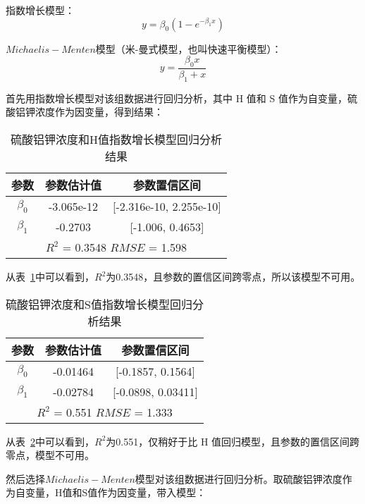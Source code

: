     指数增长模型：$$y=\beta_0(1-e^{-\beta_1x})$$

    $Michaelis-Menten$模型（米-曼式模型，也叫快速平衡模型）：
    $$y=\frac{\beta_0x}{\beta_1+x}$$
    
    首先用指数增长模型对该组数据进行回归分析，其中 H 值和 S 值作为自变量，硫酸铝钾浓度作为因变量，得到结果：
    
    \begin{table}[H]
      \centering
      \caption{硫酸铝钾浓度和H值指数增长模型回归分析结果}
      \label{硫酸铝钾浓度和H值指数}
      \begin{tabular}{@{}ccc@{}}
      \toprule
      参数        & 参数估计值      & 参数置信区间                   \\ \midrule
      $\beta_0$     & -3.065e-12     & {[}-2.316e-10, 2.255e-10{]}     \\
      $\beta_1$     & -0.2703   & {[}-1.006, 0.4653{]}    \\
      \hline
      \multicolumn{3}{c}{$R^2$ = 0.3548   $RMSE$ = 1.598} \\ \bottomrule
      \end{tabular}
    \end{table}
    
    从表~\ref{硫酸铝钾浓度和H值指数}中可以看到，$R^2$为0.3548，且参数的置信区间跨零点，所以该模型不可用。

    \begin{table}[H]
        \centering
        \caption{硫酸铝钾浓度和S值指数增长模型回归分析结果}
        \label{硫酸铝钾浓度和S值指数}
        \begin{tabular}{@{}ccc@{}}
        \toprule
        参数        & 参数估计值      & 参数置信区间                   \\ \midrule
        $\beta_0$     & -0.01464     & {[}-0.1857, 0.1564{]}     \\
        $\beta_1$     & -0.02784    & {[}-0.0898, 0.03411{]}    \\
        \hline
        \multicolumn{3}{c}{$R^2$ = 0.551   $RMSE$ = 1.333} \\ \bottomrule
        \end{tabular}
      \end{table}
    
      从表~\ref{硫酸铝钾浓度和S值指数}中可以看到，$R^2$为0.551，仅稍好于比 H 值回归模型，且参数的置信区间跨零点，模型不可用。

    
    然后选择$Michaelis-Menten$模型对该组数据进行回归分析。取硫酸铝钾浓度作为自变量，H值和S值作为因变量，带入模型：
    
